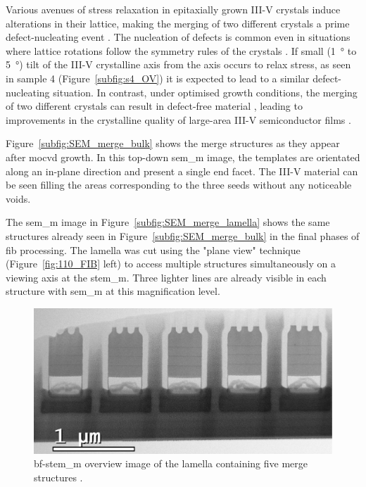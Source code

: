 Various avenues of stress relaxation in epitaxially grown III-V crystals induce alterations in their lattice, making the merging of two different crystals a prime defect-nucleating event \cite{Jacobsson2015}. The nucleation of defects is common even in situations where lattice rotations follow the symmetry rules of the crystals \cite{Rossi2023}. If small (\qty{1}{\degree} to \qty{5}{\degree}) tilt of the III-V crystalline axis from the  axis occurs to relax stress, as seen in sample 4 (Figure~\ref{subfig:s4_OV}) it is expected to lead to a similar defect-nucleating situation. In contrast, under optimised growth conditions, the merging of two different crystals can result in defect-free material \cite{Imanishi2012}, leading to improvements in the crystalline quality of large-area III-V semiconductor films \cite{Imade2014}.

Figure~\ref{subfig:SEM_merge_bulk} shows the merge structures as they appear after \acs{mocvd} growth. In this top-down \acs{sem_m} image, the templates are orientated along an in-plane  direction and present a single  end facet. The III-V material can be seen filling the areas corresponding to the three seeds without any noticeable voids. 

The \acs{sem_m} image in Figure~\ref{subfig:SEM_merge_lamella} shows the same structures already seen in Figure~\ref{subfig:SEM_merge_bulk} in the final phases of \acs{fib} processing. The lamella was cut using the "plane view" technique (Figure~\ref{fig:110_FIB} left) to access multiple structures simultaneously on a  viewing axis at the \acs{stem_m}. Three lighter lines are already visible in each structure with \acs{sem_m} at this magnification level.

\begin{figure}
    \centering
    \includegraphics[width=\textwidth]{4_Properties/Fig/merge_OV.pdf}
    \caption{\acs{bf}-\acs{stem_m} overview image of the lamella containing five merge structures \cite{Brugnolotto2023_2}.}
    \label{fig:merge_ov}
\end{figure}

